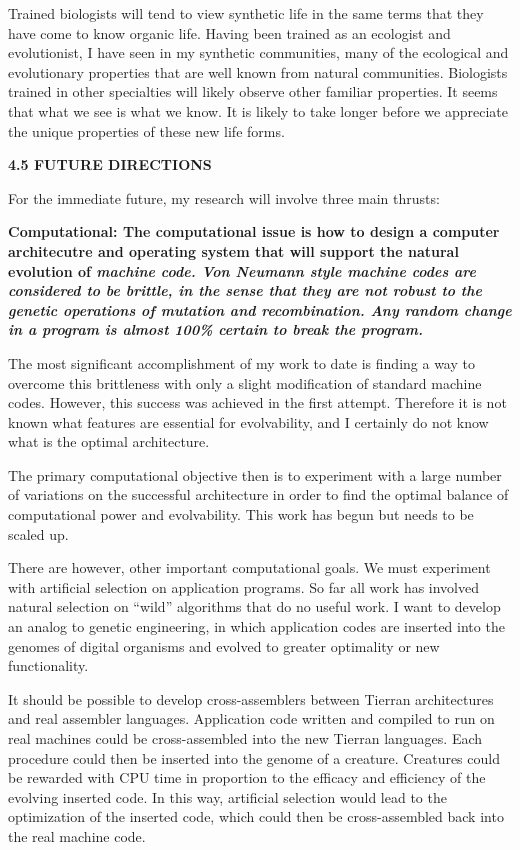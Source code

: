 Trained biologists will tend to view synthetic life in the same terms that
they have come to know organic life.  Having been trained as an ecologist
and evolutionist, I have seen in my synthetic communities, many of the
ecological and evolutionary properties that are well known from natural
communities.  Biologists trained in other specialties will likely observe
other familiar properties.  It seems that what we see is what we know.  It
is likely to take longer before we appreciate the unique properties of these
new life forms.

\LP
\bf 4.5 FUTURE DIRECTIONS\rm
\eLP

For the immediate future, my research will involve three main thrusts:

\bf Computational: \rm  The computational issue is how to design a computer
architecutre and operating system that will support the natural evolution
of \it machine code\rm .  Von Neumann style machine codes are considered to
be brittle, in the sense that they are not robust to the genetic operations
of mutation and recombination.  Any random change in a program is almost
100\% certain to break the program.

The most significant accomplishment of my work to date is finding a way to
overcome this brittleness with only a slight modification of standard machine
codes.  However, this success was achieved in the first attempt.  Therefore
it is not known what features are essential for evolvability, and I
certainly do not know what is the optimal architecture.

The primary computational objective then is to experiment with a large
number of variations on the successful architecture in order to find the
optimal balance of computational power and evolvability.  This work has
begun but needs to be scaled up.

There are however, other important computational goals.  We must experiment
with artificial selection on application programs.  So far all work has
involved natural selection on ``wild'' algorithms that do no useful work.
I want to develop an analog to genetic engineering, in which application
codes are inserted into the genomes of digital organisms and evolved to
greater optimality or new functionality.

It should be possible to develop cross-assemblers between Tierran architectures
and real assembler languages.  Application code written and compiled to run on
real machines could be cross-assembled into the new Tierran languages.  Each
procedure could then be inserted into the genome of a creature.  Creatures
could be rewarded with CPU time in proportion to the efficacy and efficiency
of the evolving inserted code.  In this way, artificial selection would lead
to the optimization of the inserted code, which could then be cross-assembled
back into the real machine code.


